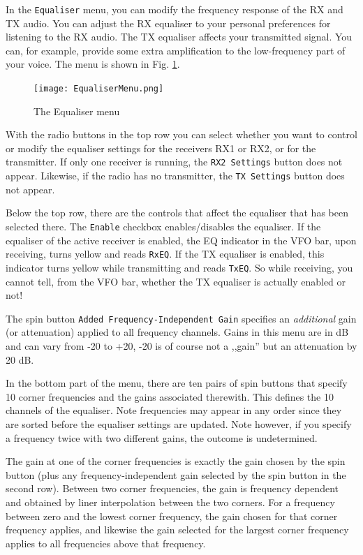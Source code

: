 \documentclass[12pt]{book}
\def\rett#1{\texttt{\color{red}#1}}
\def\bltt#1{\texttt{\color{blue}#1}}
\begin{document}
In the \bltt{Equaliser} menu, you can modify the frequency response of
the RX and TX audio. You can adjust the RX equaliser to your personal
preferences for listening to the RX audio. The TX equaliser affects
your transmitted signal. You can, for example, provide some extra
amplification to the low-frequency part of your voice. The menu
is shown in Fig. \ref{fig:EqualiserMenu}.

\begin{figure}[ht]
\center
\texttt{[image: EqualiserMenu.png]}
\caption{The Equaliser menu}
\label{fig:EqualiserMenu}
\end{figure}

With the radio buttons in the top row you can select
whether you want to control or modify the equaliser settings for the receivers
RX1 or RX2, or for the transmitter. If only one receiver is running,
the \rett{RX2 Settings} button does not appear. Likewise, if the radio
has no transmitter, the \rett{TX Settings} button does not appear.

Below the  top row, there are the controls that affect the equaliser
that has been selected there.
The \rett{Enable} checkbox enables/disables the equaliser.
If the equaliser of the active receiver
is enabled, the EQ indicator in the
VFO bar, upon receiving, turns yellow and reads \rett{RxEQ}.
If the TX equaliser is enabled, this indicator turns yellow
while transmitting and reads \rett{TxEQ}. So while receiving,
you cannot tell, from the VFO bar, whether the TX equaliser is
actually enabled or not!

The spin button \rett{Added Frequency-Independent Gain} specifies
an \textit{additional} gain (or attenuation) applied to all frequency
channels. Gains in this menu are in dB and can vary from -20 to +20,
-20 is of course  not a ,,gain'' but an attenuation by 20 dB.

In the bottom part of the menu, there are ten pairs of spin buttons
that specify 10 corner frequencies and the gains associated therewith.
This defines the 10 channels
of the equaliser. Note frequencies may appear in any order since they
are sorted before the equaliser settings are updated. Note however,
if you specify a frequency twice with two different gains, the outcome
is undetermined.

The gain at one of the   corner frequencies is exactly the gain
chosen by the spin button (plus any frequency-independent gain
selected by the spin button in the second row). Between two
corner frequencies, the gain is frequency dependent and obtained
by liner interpolation between the two corners. For a frequency
between  zero and the lowest corner frequency, the gain chosen for that corner
frequency applies, and likewise the gain selected for the largest corner frequency
applies to all frequencies above that frequency.
\end{document}

